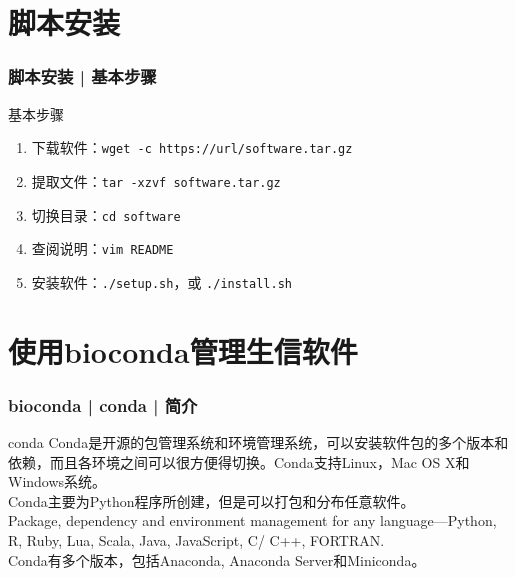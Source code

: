 \section{脚本安装}
\begin{frame}[fragile]
  \frametitle{脚本安装 | \alert{基本步骤}}
  \begin{block}{基本步骤}
    \begin{enumerate}
      \item 下载软件：\verb|wget -c https://url/software.tar.gz|
      \item 提取文件：\verb|tar -xzvf software.tar.gz|
      \item 切换目录：\verb|cd software|
      \item 查阅说明：\verb|vim README|
      \item 安装软件：\verb|./setup.sh|，或 \verb|./install.sh|
    \end{enumerate}
  \end{block}
\end{frame}

\section{使用bioconda管理生信软件}
\begin{frame}
  \frametitle{bioconda | conda | 简介}
  \begin{block}{conda}
    Conda是开源的包管理系统和环境管理系统，可以安装软件包的多个版本和依赖，而且各环境之间可以很方便得切换。Conda支持Linux，Mac OS X和Windows系统。\\
    \vspace{0.5em}
    Conda主要为Python程序所创建，但是可以打包和分布任意软件。\\
    Package, dependency and environment management for any language—Python, R, Ruby, Lua, Scala, Java, JavaScript, C/ C++, FORTRAN.\\
    \vspace{0.5em}
    Conda有多个版本，包括Anaconda, Anaconda Server和Miniconda。
  \end{block}
\end{frame}

